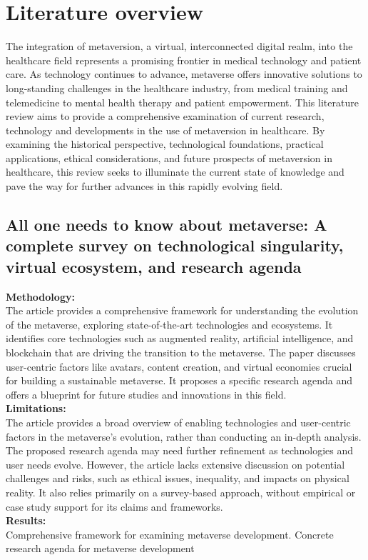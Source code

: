 \chapter{Literature overview}
\label{ch:lit-review}
The integration of metaversion, a virtual, interconnected digital realm, into the healthcare field represents a promising frontier in medical technology and patient care. As technology continues to advance, metaverse offers innovative solutions to long-standing challenges in the healthcare industry, from medical training and telemedicine to mental health therapy and patient empowerment. This literature review aims to provide a comprehensive examination of current research, technology and developments in the use of metaversion in healthcare. By examining the historical perspective, technological foundations, practical applications, ethical considerations, and future prospects of metaversion in healthcare, this review seeks to illuminate the current state of knowledge and pave the way for further advances in this rapidly evolving field.
\section{All one needs to know about metaverse: A complete survey on technological singularity, virtual ecosystem, and research agenda \cite{lee2021all}\cite{BookChapter1}}
\textbf{Methodology:}\\The article provides a comprehensive framework for understanding the evolution of the metaverse, exploring state-of-the-art technologies and ecosystems. It identifies core technologies such as augmented reality, artificial intelligence, and blockchain that are driving the transition to the metaverse. The paper discusses user-centric factors like avatars, content creation, and virtual economies crucial for building a sustainable metaverse. It proposes a specific research agenda and offers a blueprint for future studies and innovations in this field. \\
\textbf{Limitations:}\\The article provides a broad overview of enabling technologies and user-centric factors in the metaverse's evolution, rather than conducting an in-depth analysis. The proposed research agenda may need further refinement as technologies and user needs evolve. However, the article lacks extensive discussion on potential challenges and risks, such as ethical issues, inequality, and impacts on physical reality. It also relies primarily on a survey-based approach, without empirical or case study support for its claims and frameworks. \\
\textbf{Results:}\\Comprehensive framework for examining metaverse development.
Concrete research agenda for metaverse development
